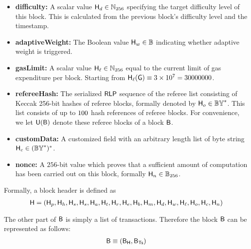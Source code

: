 \begin{itemize}[nosep]
	\item {\bf difficulty:} A scalar value $\textsf{H}_d\in\mathbb{N}_{256}$ specifying the target difficulty level of this block. This is calculated from the previous block's difficulty level and the timestamp.


	\item {\bf adaptiveWeight:} The Boolean value $\textsf{H}_w\in\mathbb{B}$ indicating whether adaptive weight is triggered.

	\item {\bf gasLimit:} A scalar value $\textsf{H}_{\ell}\in\mathbb{N}_{256}$ equal to the current limit of gas expenditure per block. 
	Starting from $\textsf{H}_{\ell}(\textsf{G})\equiv 3\times 10^7=30000000$.

	\item {\bf refereeHash:} The serialized $\mathsf{RLP}$ sequence of the referee list consisting of  Keccak 256-bit hashes of referee blocks, formally denoted by $\textsf{H}_o \in\mathbb{BY}^*$. 
	This list consists of up to $100$ hash references of referee blocks.
	For convenience, we let $\textsf{U}(\textsf{B})$ denote these referee blocks of a block $\textsf{B}$.
	
	\item {\bf customData:} A customized field with an arbitrary length list of byte string $\textsf{H}_c\in (\mathbb{BY}^*)^*$. 


	\item {\bf nonce:} A $256$-bit value which
	proves that a sufficient amount of computation has been carried out on this block, formally $\textsf{H}_n\in\mathbb{B}_{256}$.


\end{itemize}

Formally, a block header is defined as 
%
\begin{align}
	\textsf{H} = (\textsf{H}_p,\textsf{H}_h,\textsf{H}_s,\textsf{H}_s,\textsf{H}_a,\textsf{H}_t,\textsf{H}_r,\textsf{H}_e,\textsf{H}_b,\textsf{H}_m,\textsf{H}_d,\textsf{H}_w,\textsf{H}_\ell,\textsf{H}_o,\textsf{H}_c,\textsf{H}_n)
\end{align}

	
The other part of $\textsf{B}$ is simply a list of transactions. Therefore the block $\textsf{B}$ can be represented as follows:
\begin{align}
	\textsf{B}\equiv \left(\textsf{B}_{\textsf{H}}, \textsf{B}_{\textsf{Ts}} \right)
\end{align}

